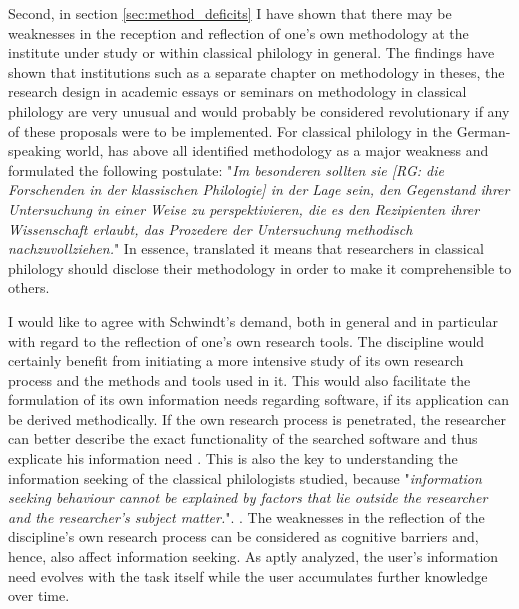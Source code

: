 \documentclass[12pt, a4paper, titlepage, oneside, abstract=true, toc=listof, toc=bibliography, BCOR=1cm]{scrreprt}
\begin{document}
{%
Second, in section \ref{sec:method_deficits} I have shown that there may be weaknesses in the reception and reflection of one's own methodology at the institute under study or within classical philology in general. The findings have shown that institutions such as a separate chapter on methodology in theses, the research design in academic essays or seminars on methodology in classical philology are very unusual and would probably be considered revolutionary if any of these proposals were to be implemented. For classical philology in the German-speaking world, \citet[p. 247]{Schwindt2011} has above all identified methodology as a major weakness and formulated the following postulate: "\textit{Im besonderen sollten sie [RG: die Forschenden in der klassischen Philologie] in der Lage sein, den Gegenstand ihrer Untersuchung in einer Weise zu perspektivieren, die es den Rezipienten ihrer Wissenschaft erlaubt, das Prozedere der Untersuchung methodisch nachzuvollziehen.}" In essence, translated it means that researchers in classical philology should disclose their methodology in order to make it comprehensible to others. 

I would like to agree with Schwindt's demand, both in general and in particular with regard to the reflection of one's own research tools. The discipline would certainly benefit from initiating a more intensive study of its own research process and the methods and tools used in it. This would also facilitate the formulation of its own information needs regarding software, if its application can be derived methodically. If the own research process is penetrated, the researcher can better describe the exact functionality of the searched software and thus explicate his information need \citep{Cole2011}. This is also the key to understanding the information seeking of the classical philologists studied, because "\textit{information seeking behaviour cannot be explained by factors that lie outside the researcher and the researcher's subject matter.}". \citep[p. 200]{Loennqvist2007}. The weaknesses in the reflection of the discipline's own research process can be considered as cognitive barriers \citep{Savolainen2015a} and, hence, also affect information seeking. As \citet{Schamber1990} aptly analyzed, the user's information need evolves with the task itself while the user accumulates further knowledge over time.

}
\end{document}
